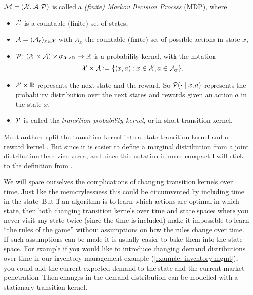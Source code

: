 \begin{definition}
	\(\mathcal{M}=(\mathcal{X},\mathcal{A},\mathcal{P}) \) is called a \emph{(finite) Markov Decision Process} (MDP), where
	\begin{itemize}[noitemsep]
		\item \(\mathcal{X}\) is a countable (finite) set of states,
		\item \(\mathcal{A}=(\mathcal{A}_x)_{x\in\mathcal{X}}\) with \(A_x\) the countable (finite) set of possible actions in state \(x\),
		\item \(\mathcal{P}\colon (\mathcal{X}\times\mathcal{A}) \times \sigma_{\mathcal{X}\times\mathbb{R}} \to \mathbb{R}\) is a probability kernel, with the notation 
		\begin{align}\label{notation: XxA}
			\mathcal{X}\times\mathcal{A}\coloneqq \{(x,a): x\in\mathcal{X}, a\in\mathcal{A}_x \}. 
		\end{align}
		\item \(\mathcal{X}\times\mathbb{R}\) represents the next state and the reward. So \(\mathcal{P}(\cdot\mid x,a) \) represents the probability distribution over the next states and rewards given an action \(a\) in the state \(x\).
		\item \(\mathcal{P}\) is called the \emph{transition probability kernel}, or in short transition kernel.  
	\end{itemize}
\end{definition}
\begin{remark}\label{split state/reward transition kernel }
	Most authors split the transition kernel into a state transition kernel and a reward kernel \parencite[e.g.][]{putermanMarkovDecisionProcesses2005}. But since it is easier to define a marginal distribution from a joint distribution than vice versa, and since this notation is more compact I will stick to the definition from \textcite{szepesvariAlgorithmsReinforcementLearning2010}. 
	
	We will spare ourselves the complications of changing transition kernels over time. Just like the memorylessness this could be circumvented by including time in the state. But if an algorithm is to learn which actions are optimal in which state, then both changing transition kernels over time and state spaces where you never visit any state twice (since the time is included) make it impossible to learn ``the rules of the game'' without assumptions on how the rules change over time. If such assumptions can be made it is usually easier to bake them into the state space. For example if you would like to introduce changing demand distributions over time in our inventory management example (\ref{example: inventory mgmt}), you could add the current expected demand to the state and the current market penetration. Then changes in the demand distribution can be modelled with a stationary transition kernel. 
\end{remark}


